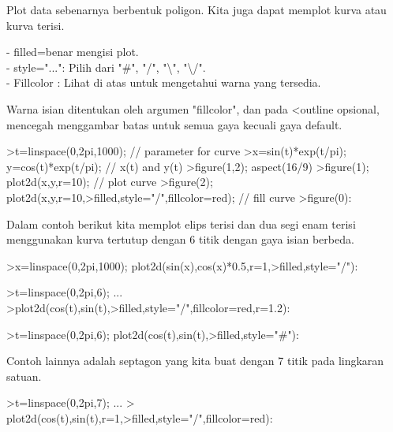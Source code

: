 \documentclass{article}
\begin{document}
\begin{eulernotebook}
\begin{eulercomment}
\begin{eulercomment}
\begin{eulercomment}
\begin{eulercomment}
\begin{eulercomment}
\begin{eulercomment}
\begin{eulercomment}
\begin{eulercomment}
\begin{eulercomment}
\begin{eulercomment}
\begin{eulercomment}
\begin{eulercomment}
\begin{eulercomment}
Plot data sebenarnya berbentuk poligon. Kita juga dapat memplot kurva
atau kurva terisi.

- filled=benar mengisi plot.\\
- style="...": Pilih dari "#", "/", "\textbackslash{}", "\textbackslash{}/".\\
- Fillcolor : Lihat di atas untuk mengetahui warna yang tersedia.

Warna isian ditentukan oleh argumen "fillcolor", dan pada \textless{}outline
opsional, mencegah menggambar batas untuk semua gaya kecuali gaya
default.
\end{eulercomment}
\begin{eulerprompt}
>t=linspace(0,2pi,1000); // parameter for curve
>x=sin(t)*exp(t/pi); y=cos(t)*exp(t/pi); // x(t) and y(t)
>figure(1,2); aspect(16/9)
>figure(1); plot2d(x,y,r=10); // plot curve
>figure(2); plot2d(x,y,r=10,>filled,style="/",fillcolor=red); // fill curve
>figure(0):
\end{eulerprompt}
\begin{eulercomment}
Dalam contoh berikut kita memplot elips terisi dan dua segi enam
terisi menggunakan kurva tertutup dengan 6 titik dengan gaya isian
berbeda.
\end{eulercomment}
\begin{eulerprompt}
>x=linspace(0,2pi,1000); plot2d(sin(x),cos(x)*0.5,r=1,>filled,style="/"):
\end{eulerprompt}
\begin{eulerprompt}
>t=linspace(0,2pi,6); ...
>plot2d(cos(t),sin(t),>filled,style="/",fillcolor=red,r=1.2):
\end{eulerprompt}
\begin{eulerprompt}
>t=linspace(0,2pi,6); plot2d(cos(t),sin(t),>filled,style="#"):
\end{eulerprompt}
\begin{eulercomment}
Contoh lainnya adalah septagon yang kita buat dengan 7 titik pada
lingkaran satuan.
\end{eulercomment}
\begin{eulerprompt}
>t=linspace(0,2pi,7);  ...
> plot2d(cos(t),sin(t),r=1,>filled,style="/",fillcolor=red):

\end{eulerprompt}
\end{eulercomment}
\end{eulercomment}
\end{eulercomment}
\end{eulercomment}
\end{eulercomment}
\end{eulercomment}
\end{eulercomment}
\end{eulercomment}
\end{eulercomment}
\end{eulercomment}
\end{eulercomment}
\end{eulercomment}
\end{eulernotebook}
\end{document}
